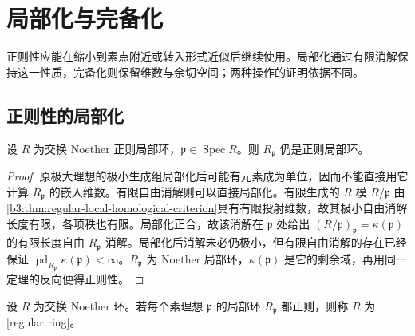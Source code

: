 
\section{局部化与完备化}
\label{b3:sec:1803}

正则性应能在缩小到素点附近或转入形式近似后继续使用。局部化通过有限消解保持这一性质，完备化则保留维数与余切空间；两种操作的证明依据不同。

%
%

\subsection{正则性的局部化}
\label{b3:subsec:1803:01}

\begin{theorem}\label{b3:thm:regular-local-localization}
	设 \(R\) 为交换 Noether 正则局部环，\(\mathfrak p\in\operatorname{Spec}R\)。则 \(R_{\mathfrak p}\) 仍是正则局部环。
\end{theorem}
\begin{proof}
	原极大理想的极小生成组局部化后可能有元素成为单位，因而不能直接用它计算 \(R_{\mathfrak p}\) 的嵌入维数。有限自由消解则可以直接局部化。有限生成的 \(R\) 模 \(R/\mathfrak p\) 由\cref{b3:thm:regular-local-homological-criterion}具有有限投射维数，故其极小自由消解长度有限，各项秩也有限。局部化正合，故该消解在 \(\mathfrak p\) 处给出 \((R/\mathfrak p)_{\mathfrak p}=\kappa(\mathfrak p)\) 的有限长度自由 \(R_{\mathfrak p}\) 消解。局部化后消解未必仍极小，但有限自由消解的存在已经保证 \(\operatorname{pd}_{R_{\mathfrak p}}\kappa(\mathfrak p)<\infty\)。\(R_{\mathfrak p}\) 为 Noether 局部环，\(\kappa(\mathfrak p)\) 是它的剩余域，再用同一定理的反向便得正则性。
\end{proof}

\begin{definition}\label{b3:def:regular-ring}
	设 \(R\) 为交换 Noether 环。若每个素理想 \(\mathfrak p\) 的局部环 \(R_{\mathfrak p}\) 都正则，则称 \(R\) 为[regular ring]。
\end{definition}

